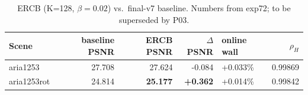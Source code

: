 \begin{table}[t]
  \centering
  \small
  \begin{tabular}{lrrrlr}
    \toprule
    Scene & baseline PSNR & ERCB PSNR & $\Delta$PSNR & online wall & $\rho_H$ \\
    \midrule
    aria1253 & 27.708 & 27.624 & -0.084 & +0.033\% & 0.99869 \\
    aria1253rot & 24.814 & \textbf{25.177} & \textbf{+0.362} & +0.014\% & 0.99842 \\
    \bottomrule
  \end{tabular}
  \caption{ERCB (K{=}128, $\beta{=}0.02$) vs.\ final-v7 baseline. Numbers from exp72; to be superseded by P03.}
  \label{tab:ercb_exp72_prior}
\end{table}
